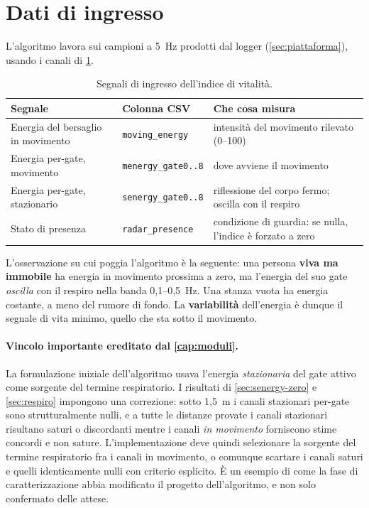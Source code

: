 \section{Dati di ingresso}
\label{sec:vitalita-ingressi}

L'algoritmo lavora sui campioni a 5~Hz prodotti dal logger
(\cref{sec:piattaforma}), usando i canali di \cref{tab:vitalita-ingressi}.

\begin{table}[htbp]
\centering
\caption{Segnali di ingresso dell'indice di vitalità.}
\label{tab:vitalita-ingressi}
\small
\begin{tabularx}{\textwidth}{@{}llX@{}}
\toprule
\textbf{Segnale} & \textbf{Colonna CSV} & \textbf{Che cosa misura} \\
\midrule
Energia del bersaglio in movimento & \texttt{moving\_energy} &
  intensità del movimento rilevato (0--100) \\
Energia per-gate, movimento & \texttt{menergy\_gate0..8} &
  dove avviene il movimento \\
Energia per-gate, stazionario & \texttt{senergy\_gate0..8} &
  riflessione del corpo fermo; oscilla con il respiro \\
Stato di presenza & \texttt{radar\_presence} &
  condizione di guardia: se nulla, l'indice è forzato a zero \\
\bottomrule
\end{tabularx}
\end{table}

L'osservazione su cui poggia l'algoritmo è la seguente: una persona \textbf{viva ma
immobile} ha energia in movimento prossima a zero, ma l'energia del suo gate
\emph{oscilla} con il respiro nella banda 0,1--0,5~Hz. Una stanza vuota ha energia
costante, a meno del rumore di fondo. La \textbf{variabilità} dell'energia è dunque
il segnale di vita minimo, quello che sta sotto il movimento.

\paragraph{Vincolo importante ereditato dal \cref{cap:moduli}.} La formulazione
iniziale dell'algoritmo usava l'energia \emph{stazionaria} del gate attivo come
sorgente del termine respiratorio. I risultati di \cref{sec:senergy-zero} e
\cref{sec:respiro} impongono una correzione: sotto 1,5~m i canali stazionari per-gate
sono strutturalmente nulli, e a tutte le distanze provate i canali stazionari
risultano saturi o discordanti mentre i canali \emph{in movimento} forniscono stime
concordi e non sature. L'implementazione deve quindi selezionare la sorgente del
termine respiratorio fra i canali in movimento, o comunque scartare i canali saturi
e quelli identicamente nulli con criterio esplicito. È un esempio di come la fase di
caratterizzazione abbia modificato il progetto dell'algoritmo, e non solo confermato
delle attese.

